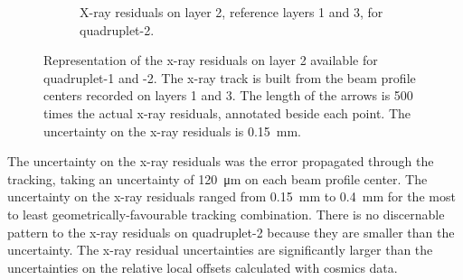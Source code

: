 \begin{figure}
\begin{subfigure}{\textwidth}
  \caption{X-ray residuals on layer 2, reference layers 1 and 3, for quadruplet-2.}
  \label{fig:xray_res_th2_ql2p8}
\end{subfigure}
\caption{Representation of the x-ray residuals on layer 2 available for quadruplet-1 and -2. The x-ray track is built from the beam profile centers recorded on layers 1 and 3. The length of the arrows is 500 times the actual x-ray residuals, annotated beside each point. The uncertainty on the x-ray residuals is \SI{0.15}{mm}.}
\label{fig:xray_res_th2}
\end{figure}
\newpage
\restoregeometry

The uncertainty on the x-ray residuals was the error propagated through the tracking, taking an uncertainty of \SI{120}{\micro\meter} on each beam profile center. The uncertainty on the x-ray residuals ranged from \SI{0.15}{mm} to \SI{0.4}{mm} for the most to least geometrically-favourable tracking combination. There is no discernable pattern to the x-ray residuals on quadruplet-2 because they are smaller than the uncertainty. The x-ray residual uncertainties are significantly larger than the uncertainties on the relative local offsets calculated with cosmics data.
